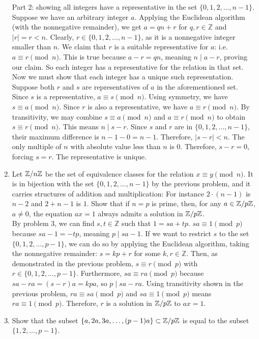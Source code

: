 \documentclass{amsart}
\begin{document}
\begin{enumerate}[itemsep=0.4in]
Part 2: showing all integers have a representative in the set $\{0,1,2,...,n-1\}$. Suppose we have an arbitrary integer $a$. Applying the Euclidean algorithm (with the nonnegative remainder), we get $a=qn+r$ for $q,r\in\mathbb{Z}$ and $|r|=r<n$. Clearly, $r\in\{0,1,2,...,n-1\}$, as it is a nonnegative integer smaller than $n$. We claim that $r$ is a suitable representative for $a$: i.e. $a\equiv r\pmod n$. This is true because $a-r=qn$, meaning $n\mid a-r$, proving our claim. So each integer has a representative for the relation in that set. Now we must show that each integer has a unique such representation. Suppose both $r$ and $s$ are representatives of $a$ in the aforementioned set. Since $s$ is a representative, $a\equiv s\pmod n$. Using symmetry, we have $s\equiv a\pmod n$. Since $r$ is also a representative, we have $a\equiv r\pmod n$. By transitivity, we may combine $s\equiv a\pmod n$ and $a\equiv r\pmod n$ to obtain $s\equiv r\pmod n$. This means $n\mid s-r$. Since $s$ and $r$ are in $\{0,1,2,...,n-1\}$, their maximum difference is $n-1-0=n-1$. Therefore, $|s-r|<n$. The only multiple of $n$ with absolute value less than $n$ is $0$. Therefore, $s-r=0$, forcing $s=r$. The representative is unique.

\item Let $\mathbb{Z}/n\mathbb{Z}$ be the set of equivalence classes for the relation $x\equiv y\pmod{n}$. It is in bijection with the set $\{0,1,2,\ldots,n-1\}$ by the previous problem, and it carries structures of addition and multiplication: For instance $2\cdot (n-1)$ is $n-2$ and $2+n-1$ is $1$. Show that if $n=p$ is prime, then, for any $a\in \mathbb{Z}/p\mathbb{Z}$, $a\neq 0$, the equation $ax = 1$ always admits a solution in $\mathbb{Z}/p\mathbb{Z}$.\\

By problem 3, we can find $s,t\in\mathbb Z$ such that $1=sa+tp$. $sa\equiv1\pmod p$ because $sa-1=-tp$, meaning $p\mid sa-1$. If we want to restrict $s$ to the set $\{0,1,2,...,p-1\}$, we can do so by applying the Euclidean algorithm, taking the nonnegative remainder: $s=kp+r$ for some $k,r\in\mathbb Z$. Then, as demonstrated in the previous problem, $s\equiv r\pmod p$ with $r\in\{0,1,2,...,p-1\}$. Furthermore, $sa\equiv ra\pmod p$ because $sa-ra=(s-r)a=kpa$, so $p\mid sa-ra$. Using transitivity shown in the previous problem, $ra\equiv sa\pmod p$ and $sa\equiv1\pmod p$ means $ra\equiv1\pmod p$. Therefore, $r$ is a solution in $\mathbb{Z}/p\mathbb{Z}$ to $ax=1$.


\item Show that the subset $\{a,2a,3a,\ldots,(p-1)a\}\subset \mathbb{Z}/p\mathbb{Z}$ is equal to the subset $\{1,2,\ldots,p-1\}$.\\


\end{enumerate}
\end{document}
